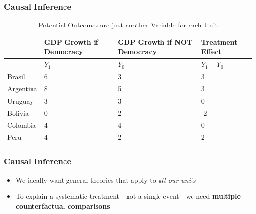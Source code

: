 \documentclass[xcolor=x11names,compress]{beamer}\usepackage[]{graphicx}\usepackage[]{xcolor}
\renewcommand{\(}{\begin{columns}}
\renewcommand{\)}{\end{columns}}
\newcommand{\<}[1]{\begin{column}{#1}}
\renewcommand{\>}{\end{column}}
\begin{document}
\begin{frame}
\frametitle{Causal Inference}
\footnotesize
\begin{table}[htbp]
  \centering
  \caption{Potential Outcomes are just another Variable for each Unit}
    \begin{tabular}{|p{2.4cm}|p{2.4cm}|p{2.4cm}|p{2.4cm}|}
    \hline
          & \multicolumn{1}{p{2.4cm}|}{GDP Growth if Democracy} & \multicolumn{1}{p{2.4cm}|}{GDP Growth if  NOT Democracy} &  Treatment Effect\bigstrut\\
    \hline
          & \multicolumn{1}{l|}{$Y_1$} & \multicolumn{1}{l|}{$Y_0$} & \multicolumn{1}{l|}{$Y_1-Y_0$} \bigstrut\\
    \hline
    Brasil & 6     & 3     & 3 \bigstrut\\
    \hline
    Argentina & 8    & 5     & 3 \bigstrut\\
    \hline
    Uruguay & 3 & 3 & 0  \bigstrut\\
    \hline
    Bolivia & 0     & 2     & -2 \bigstrut\\
    \hline
    Colombia & 4    & 4    & 0 \bigstrut\\
    \hline
    Peru & 4     & 2     & 2 \bigstrut\\
    \hline
    \end{tabular}%
  \label{tab:addlabel}%
\end{table}%
\normalsize
\end{frame}

\begin{frame}
\frametitle{Causal Inference}
\begin{itemize}
\item We ideally want general theories that apply to \textit{all our units}
\pause
\item To explain a systematic treatment - not a single event - we need \textbf{multiple counterfactual comparisons}
\pause
{}
\end{itemize}
\end{frame}
\end{document}
